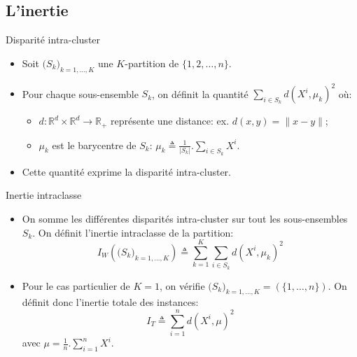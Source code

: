 \documentclass[8pt]{beamer}
\begin{document}
		\subsection{L'inertie}
			\begin{frame}{Disparité intra-cluster}
				\begin{itemize}
					\item<1-> Soit \(\big(S_k\big)_{k = 1, \dots, K}\) une \(K\)-partition de \(\{1, 2, \dots, n\}\).
					\item<2-> Pour chaque sous-ensemble \(S_k\), on définit la quantité \(\sum_{i\in S_k} d(X^i, \mu_k)^2\) où:
						\begin{itemize}
							\item<3-> \(d: \mathbb{R}^d \times \mathbb{R}^d \rightarrow \mathbb{R}_+\) représente une distance: ex. \(d(x, y) = \lVert x - y \rVert\);
							\item<3-> \(\mu_k\) est le barycentre de \(S_k\): \( \mu_k \triangleq \frac{1}{\vert S_k \vert}.\sum_{i\in S_k} X^i\).
						\end{itemize}
					\item<4-> Cette quantité exprime la disparité intra-cluster.
				\end{itemize}
			\end{frame}

			\begin{frame}{Inertie intraclasse}
				\begin{itemize}
					\item<1-> On somme les différentes disparités intra-cluster sur tout les sous-ensembles \(S_k\). On définit l'inertie intraclasse de la partition:
						\begin{equation}
							I_W(\big(S_k\big)_{k = 1, \dots, K}) \triangleq \sum_{k= 1}^{K} \sum_{i\in S_k} d(X^i, \mu_k)^2
						\end{equation}
					\item<2-> Pour le cas particulier de \(K=1\), on vérifie \(\big(S_k\big)_{k = 1, \dots, K} = (\{1,\dots,n\})\). On définit donc l'inertie totale des instances:
						\begin{equation}
							I_T \triangleq \sum_{i=1}^{n} d(X^i, \mu)^2
						\end{equation}
						avec \(\mu = \frac{1}{n} . \sum_{i=1}^{n} X^i\).
				\end{itemize}
			\end{frame}
\end{document}
